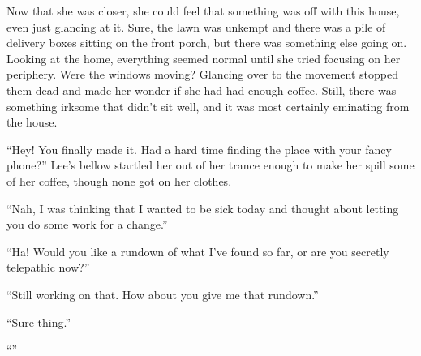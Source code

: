 \documentclass[9pt]{memoir}
\begin{document}
\vspace{1em}

Now that she was closer, she could feel that something was off with this house, even just glancing at it. Sure, the lawn was unkempt and there was a pile of delivery boxes sitting on the front porch, but there was something else going on. Looking at the home, everything seemed normal until she tried focusing on her periphery. Were the windows moving? Glancing over to the movement stopped them dead and made her wonder if she had had enough coffee. Still, there was something irksome that didn't sit well, and it was most certainly eminating from the house.

``Hey! You finally made it. Had a hard time finding the place with your fancy phone?'' Lee's bellow startled her out of her trance enough to make her spill some of her coffee, though none got on her clothes.

``Nah, I was thinking that I wanted to be sick today and thought about letting you do some work for a change.''

``Ha! Would you like a rundown of what I've found so far, or are you secretly telepathic now?''

``Still working on that. How about you give me that rundown.''

``Sure thing.''

``''


\backmatter
\end{document}
